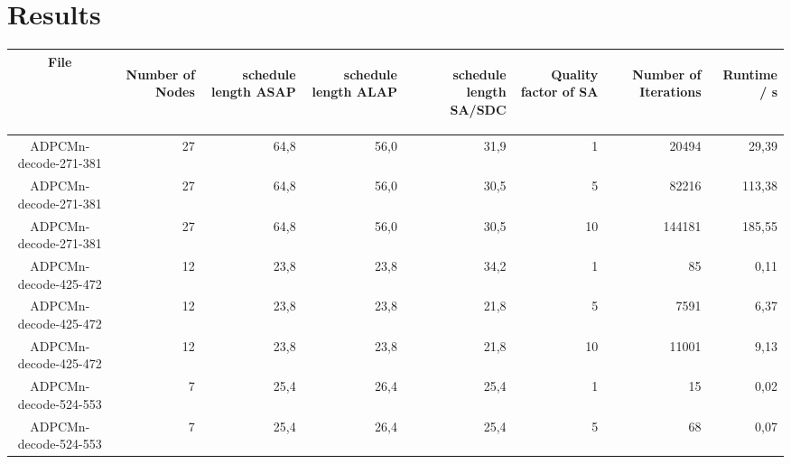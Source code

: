 \documentclass[colorback,accentcolor=tud1c,11pt]{tudreport}
\begin{document}
  \chapter{Results}
  \vspace{100pt}
  \begin{tabular}{ c | r | r | r | r | r | r | r }
    File &
    \begin{rotate}{60} Number of Nodes \end{rotate} \hspace{3pt} &
    \begin{rotate}{60} schedule length ASAP \end{rotate} \hspace{10pt} &
    \begin{rotate}{60} schedule length ALAP \end{rotate} \hspace{10pt} &
    \begin{rotate}{60} schedule length SA/SDC \end{rotate} \hspace{10pt} &
    \begin{rotate}{60} Quality factor of SA \end{rotate} \hspace{3pt} &
    \begin{rotate}{60} Number of Iterations \end{rotate} \hspace{12pt} &
    \begin{rotate}{60} Runtime / s \end{rotate} \hspace{12pt} \\
   \hline
   ADPCMn-decode-271-381 & 27 & 64,8 & 56,0 & 31,9 & 1 & 20494 & 29,39 \\
   ADPCMn-decode-271-381 & 27 & 64,8 & 56,0 & 30,5 & 5 & 82216 & 113,38 \\
   ADPCMn-decode-271-381 & 27 & 64,8 & 56,0 & 30,5 & 10 & 144181 & 185,55 \\
   ADPCMn-decode-425-472 & 12 & 23,8 & 23,8 & 34,2 & 1 & 85 & 0,11 \\
   ADPCMn-decode-425-472 & 12 & 23,8 & 23,8 & 21,8 & 5 & 7591 & 6,37 \\
   ADPCMn-decode-425-472 & 12 & 23,8 & 23,8 & 21,8 & 10 & 11001 & 9,13 \\
   ADPCMn-decode-524-553 & 7 & 25,4 & 26,4 & 25,4 & 1 & 15 & 0,02 \\
   ADPCMn-decode-524-553 & 7 & 25,4 & 26,4 & 25,4 & 5 & 68 & 0,07 \\

\end{tabular}
\end{document}
